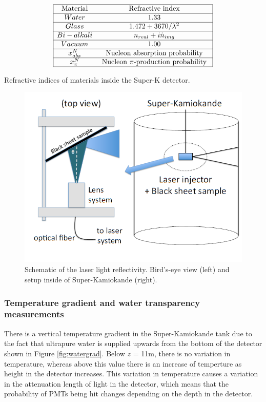 \begin{table}[H]
    $$
    \begin{array}{|cc|}
    \hline \text{Material} & \text{Refractive index} \\
    \hline Water & 1.33 \\
    \hline Glass & 1.472+3670/\lambda^{2} \\
    \hline Bi-alkali & n_{real} + i \dot n_{img} \\
    \hline Vacuum & 1.00 \\
    \hline x_{a b s}^{N} & \text { Nucleon absorption probability }  \\
    \hline x_{\pi}^{N} & \text { Nucleon } \pi \text {-production probability }\\
    \hline

    
    \end{array}
    $$
    \caption{Refractive indices of materials inside the Super-K detector.} 
    \label{table:refractiveindex}
    \end{table}
    

\begin{figure}
    \includegraphics[width=\textwidth]{Figures/blacksheetrefsetup.png}
\caption{Schematic of the laser light reflectivity. Bird's-eye view (left) and setup inside of Super-Kamiokande (right).}
    \label{fig:blacksheetrefsetup}
\end{figure}

\subsubsection{Temperature gradient and water transparency measurements}
There is a vertical temperature gradient in the Super-Kamiokande tank due to the fact that ultrapure water is supplied upwards from the bottom of the detector shown in Figure \ref{fig:watergrad}. Below $z$ = 11m, there is no variation in temperature, whereas above this value there is an increase of temperture as height in the detector increases. This variation in temperature causes a variation in the attenuation length of light in the detector, which means that the probability of PMTs being hit changes depending on the depth in the detector. 

